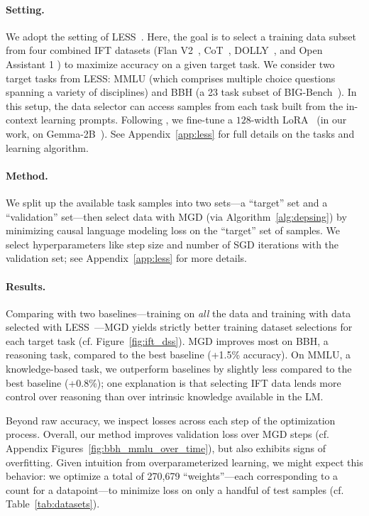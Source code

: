 \paragraph{Setting.}
We adopt the setting of LESS~\citep{xia2024less}. Here, the goal is to select a
training data subset from four combined IFT datasets (Flan
  V2~\citep{longpre2023flan}, CoT~\citep{wei2022chain},
  DOLLY~\citep{conover2023free}, and Open Assistant 1
\citep{kopf2024openassistant}) to maximize accuracy on a given target task. We
consider two target tasks from LESS: MMLU (which comprises multiple choice
questions spanning a variety of disciplines) and BBH (a 23 task subset of
BIG-Bench~\citep{srivastava2022beyond}).
In this setup, the data selector can access samples from
each task built from the in-context learning prompts.
Following \citet{xia2024less}, we
fine-tune a $128$-width LoRA~\citep{huang2020dynamics} (in our work, on
Gemma-2B~\citep{team2024gemma}). See Appendix~\ref{app:less} for full details on
the tasks and learning algorithm.

\paragraph{Method.}
We split up the available task samples into two sets---a ``target'' set and a
``validation'' set---then select data with MGD (via Algorithm~\ref{alg:depsing})
by minimizing causal language modeling loss on the ``target'' set of samples.
We select hyperparameters like step size and number of SGD iterations with the
validation set; see Appendix~\ref{app:less} for more details.

\paragraph{Results.}
Comparing with two baselines---training on \textit{all} the data and training
with data selected with LESS~\citep{xia2024less}---MGD yields strictly better
training dataset selections for each target task (cf. Figure~\ref{fig:ift_dss}).
MGD improves most on BBH, a reasoning task, compared to the best
baseline (+1.5\% accuracy). On MMLU, a knowledge-based task, we
outperform baselines by slightly less compared to the best baseline (+0.8\%);
one explanation is that selecting IFT data lends more control over reasoning
than over intrinsic knowledge available in the LM.

Beyond raw accuracy, we inspect losses across each step of the optimization
process. Overall, our method improves validation loss over MGD steps
(cf. Appendix Figures~\ref{fig:bbh_mmlu_over_time}), but also
exhibits signs of overfitting. Given intuition from
overparameterized learning, we might expect this behavior: we optimize a total
of 270,679 ``weights''---each corresponding to a count for a datapoint---to
minimize loss on only a handful of test samples (cf.
Table~\ref{tab:datasets}).

